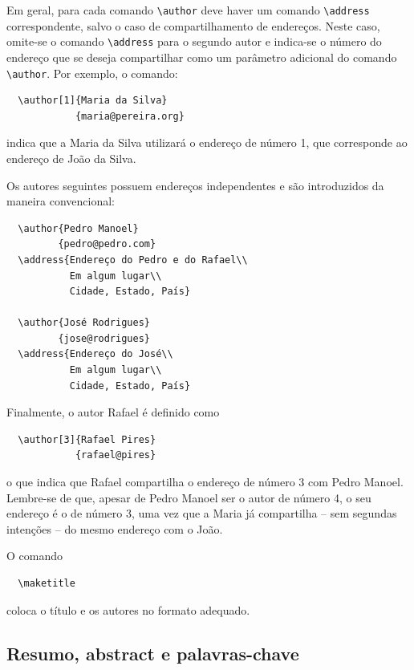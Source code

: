 \documentclass[conference,harvard,brazil,english]{sbatex}
\begin{document}
Em geral, para cada comando \verb+\author+ deve haver um comando
\verb+\address+ correspondente, salvo o caso de compartilhamento
de endereços. Neste caso, omite-se o comando \verb+\address+ para
o segundo autor e indica-se o número do endereço que se deseja
compartilhar como um parâmetro adicional do comando
\verb+\author+. Por exemplo, o comando:
\begin{verbatim}
  \author[1]{Maria da Silva}
            {maria@pereira.org}
\end{verbatim}
indica que a Maria da Silva utilizará o endereço de número 1, que
corresponde ao endereço de João da Silva.

Os autores seguintes possuem endereços independentes e são
introduzidos da maneira convencional:
\begin{verbatim}
  \author{Pedro Manoel}
         {pedro@pedro.com}
  \address{Endereço do Pedro e do Rafael\\
           Em algum lugar\\
           Cidade, Estado, País}

  \author{José Rodrigues}
         {jose@rodrigues}
  \address{Endereço do José\\
           Em algum lugar\\
           Cidade, Estado, País}
\end{verbatim}

Finalmente, o autor Rafael é definido como
\begin{verbatim}
  \author[3]{Rafael Pires}
            {rafael@pires}
\end{verbatim}
o que indica que Rafael compartilha o endereço de número 3 com Pedro
Manoel. Lembre-se de que, apesar de Pedro Manoel ser o autor de número
4, o seu endereço é o de número 3, uma vez que a Maria já compartilha
-- sem segundas intenções -- do mesmo endereço com o João.

O comando
\begin{verbatim}
  \maketitle
\end{verbatim}
coloca o título e os autores no formato adequado.


\subsection{Resumo, abstract e palavras-chave}
\end{document}
